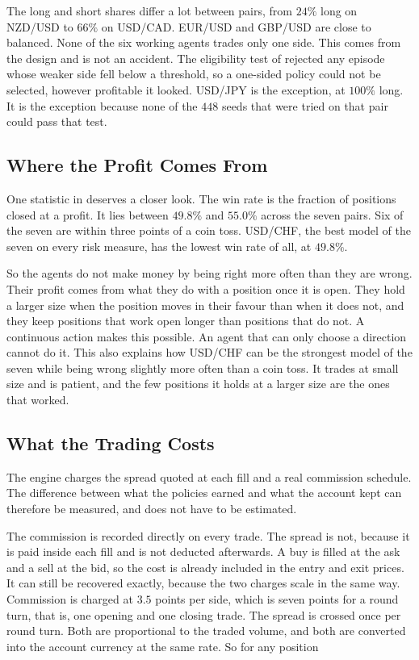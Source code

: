 The long and short shares differ a lot between pairs, from $24\%$ long on NZD/USD to $66\%$ on USD/CAD. EUR/USD and GBP/USD are close to balanced. None of the six working agents trades only one side. This comes from the design and is not an accident. The eligibility test of  rejected any episode whose weaker side fell below a threshold, so a one-sided policy could not be selected, however profitable it looked. USD/JPY is the exception, at $100\%$ long. It is the exception because none of the $448$ seeds that were tried on that pair could pass that test.

\subsection{Where the Profit Comes From}

One statistic in  deserves a closer look. The win rate is the fraction of positions closed at a profit. It lies between $49.8\%$ and $55.0\%$ across the seven pairs. Six of the seven are within three points of a coin toss. USD/CHF, the best model of the seven on every risk measure, has the lowest win rate of all, at $49.8\%$.

So the agents do not make money by being right more often than they are wrong. Their profit comes from what they do with a position once it is open. They hold a larger size when the position moves in their favour than when it does not, and they keep positions that work open longer than positions that do not. A continuous action makes this possible. An agent that can only choose a direction cannot do it. This also explains how USD/CHF can be the strongest model of the seven while being wrong slightly more often than a coin toss. It trades at small size and is patient, and the few positions it holds at a larger size are the ones that worked.

\subsection{What the Trading Costs}

The engine charges the spread quoted at each fill and a real commission schedule. The difference between what the policies earned and what the account kept can therefore be measured, and does not have to be estimated.

The commission is recorded directly on every trade. The spread is not, because it is paid inside each fill and is not deducted afterwards. A buy is filled at the ask and a sell at the bid, so the cost is already included in the entry and exit prices. It can still be recovered exactly, because the two charges scale in the same way. Commission is charged at $3.5$ points per side, which is seven points for a round turn, that is, one opening and one closing trade. The spread is crossed once per round turn. Both are proportional to the traded volume, and both are converted into the account currency at the same rate. So for any position

